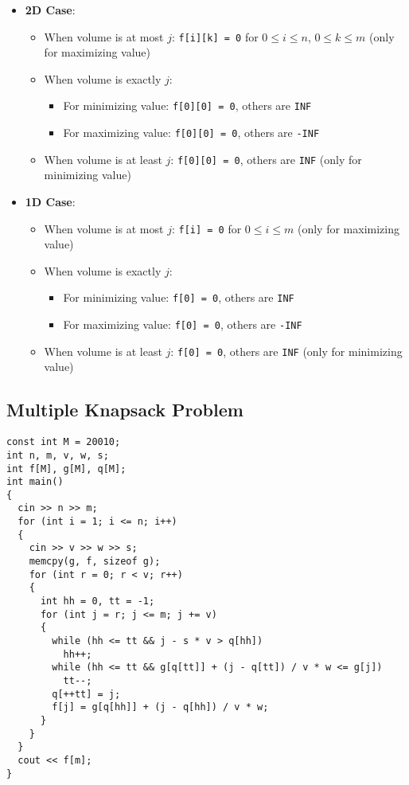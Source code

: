 \begin{itemize}
    \item \textbf{2D Case}:
    \begin{itemize}
      \item When volume is at most $j$: \texttt{f[i][k] = 0} for $0 \leq i \leq n$, $0 \leq k \leq m$ (only for maximizing value)
      \item When volume is exactly $j$:
      \begin{itemize}
        \item For minimizing value: \texttt{f[0][0] = 0}, others are \texttt{INF}
        \item For maximizing value: \texttt{f[0][0] = 0}, others are \texttt{-INF}
      \end{itemize}
      \item When volume is at least $j$: \texttt{f[0][0] = 0}, others are \texttt{INF} (only for minimizing value)
    \end{itemize}

    \item \textbf{1D Case}:
    \begin{itemize}
      \item When volume is at most $j$: \texttt{f[i] = 0} for $0 \leq i \leq m$ (only for maximizing value)
      \item When volume is exactly $j$:
      \begin{itemize}
        \item For minimizing value: \texttt{f[0] = 0}, others are \texttt{INF}
        \item For maximizing value: \texttt{f[0] = 0}, others are \texttt{-INF}
      \end{itemize}
      \item When volume is at least $j$: \texttt{f[0] = 0}, others are \texttt{INF} (only for minimizing value)
    \end{itemize}
\end{itemize}
\subsection{Multiple Knapsack Problem}
\begin{lstlisting}
const int M = 20010;
int n, m, v, w, s;
int f[M], g[M], q[M];
int main()
{
  cin >> n >> m;
  for (int i = 1; i <= n; i++)
  {
    cin >> v >> w >> s;
    memcpy(g, f, sizeof g);
    for (int r = 0; r < v; r++)
    {
      int hh = 0, tt = -1;
      for (int j = r; j <= m; j += v)
      {
        while (hh <= tt && j - s * v > q[hh])
          hh++;
        while (hh <= tt && g[q[tt]] + (j - q[tt]) / v * w <= g[j])
          tt--;
        q[++tt] = j;
        f[j] = g[q[hh]] + (j - q[hh]) / v * w;
      }
    }
  }
  cout << f[m];
}
\end{lstlisting}
